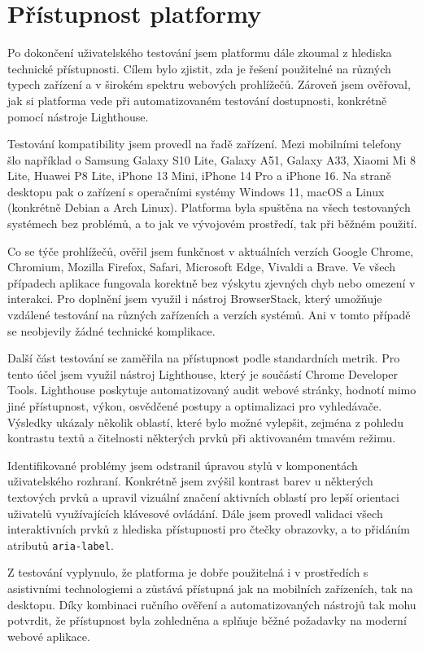 \section{Přístupnost platformy}

Po dokončení uživatelského testování jsem platformu dále zkoumal z hlediska technické přístupnosti. 
Cílem bylo zjistit, zda je řešení použitelné na různých typech zařízení a v širokém spektru webových prohlížečů. 
Zároveň jsem ověřoval, jak si platforma vede při automatizovaném testování dostupnosti, konkrétně pomocí nástroje Lighthouse.

Testování kompatibility jsem provedl na řadě zařízení. 
Mezi mobilními telefony šlo například o Samsung Galaxy S10 Lite, Galaxy A51, Galaxy A33, Xiaomi Mi 8 Lite, Huawei P8 Lite, iPhone 13 Mini, iPhone 14 Pro a iPhone 16. 
Na straně desktopu pak o zařízení s operačními systémy Windows 11, macOS a Linux (konkrétně Debian a Arch Linux). 
Platforma byla spuštěna na všech testovaných systémech bez problémů, a to jak ve vývojovém prostředí, tak při běžném použití.

Co se týče prohlížečů, ověřil jsem funkčnost v aktuálních verzích Google Chrome, Chromium, Mozilla Firefox, Safari, Microsoft Edge, Vivaldi a Brave. 
Ve všech případech aplikace fungovala korektně bez výskytu zjevných chyb nebo omezení v interakci. 
Pro doplnění jsem využil i nástroj BrowserStack, který umožňuje vzdálené testování na různých zařízeních a verzích systémů. Ani v tomto případě se neobjevily žádné technické komplikace.

Další část testování se zaměřila na přístupnost podle standardních metrik. 
Pro tento účel jsem využil nástroj Lighthouse, který je součástí Chrome Developer Tools. 
Lighthouse poskytuje automatizovaný audit webové stránky, hodnotí mimo jiné přístupnost, výkon, osvědčené postupy a optimalizaci pro vyhledávače. 
Výsledky ukázaly několik oblastí, které bylo možné vylepšit, zejména z pohledu kontrastu textů a čitelnosti některých prvků při aktivovaném tmavém režimu.

Identifikované problémy jsem odstranil úpravou stylů v komponentách uživatelského rozhraní. 
Konkrétně jsem zvýšil kontrast barev u některých textových prvků a upravil vizuální značení aktivních oblastí pro lepší orientaci uživatelů využívajících klávesové ovládání.
Dále jsem provedl validaci všech interaktivních prvků z hlediska přístupnosti pro čtečky obrazovky, a to přidáním atributů \texttt{aria-label}.

Z testování vyplynulo, že platforma je dobře použitelná i v prostředích s asistivními technologiemi a zůstává přístupná jak na mobilních zařízeních, tak na desktopu.
Díky kombinaci ručního ověření a automatizovaných nástrojů tak mohu potvrdit, že přístupnost byla zohledněna a splňuje běžné požadavky na moderní webové aplikace.

